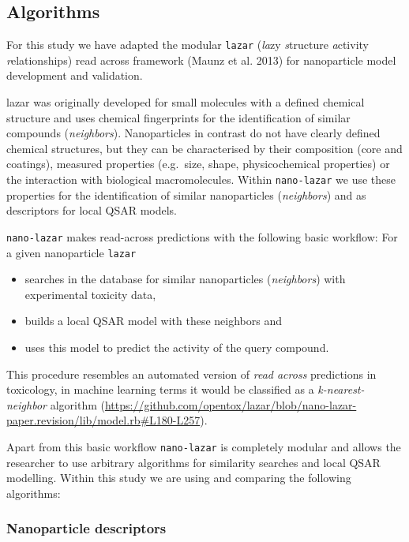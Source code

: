 \documentclass[utf8]{frontiersHLTH} %
\providecommand{\tightlist}{%
  \setlength{\itemsep}{0pt}\setlength{\parskip}{0pt}}
\begin{document}
\subsection{Algorithms}\label{algorithms}

For this study we have adapted the modular \texttt{lazar} (\emph{la}zy
\emph{s}tructure \emph{a}ctivity \emph{r}elationships) read across
framework (Maunz et al. 2013) for nanoparticle model development and
validation.

lazar was originally developed for small molecules with a defined
chemical structure and uses chemical fingerprints for the identification
of similar compounds (\emph{neighbors}). Nanoparticles in contrast do
not have clearly defined chemical structures, but they can be
characterised by their composition (core and coatings), measured
properties (e.g.~size, shape, physicochemical properties) or the
interaction with biological macromolecules. Within \texttt{nano-lazar}
we use these properties for the identification of similar nanoparticles
(\emph{neighbors}) and as descriptors for local QSAR models.

\texttt{nano-lazar} makes read-across predictions with the following
basic workflow: For a given nanoparticle \texttt{lazar}

\begin{itemize}
\tightlist
\item
  searches in the database for similar nanoparticles (\emph{neighbors})
  with experimental toxicity data,
\item
  builds a local QSAR model with these neighbors and
\item
  uses this model to predict the activity of the query compound.
\end{itemize}

This procedure resembles an automated version of \emph{read across}
predictions in toxicology, in machine learning terms it would be
classified as a \emph{k-nearest-neighbor} algorithm
(\url{https://github.com/opentox/lazar/blob/nano-lazar-paper.revision/lib/model.rb\#L180-L257}).

Apart from this basic workflow \texttt{nano-lazar} is completely modular
and allows the researcher to use arbitrary algorithms for similarity
searches and local QSAR modelling. Within this study we are using and
comparing the following algorithms:

\subsubsection{Nanoparticle descriptors}\label{nanoparticle-descriptors}
\end{document}
